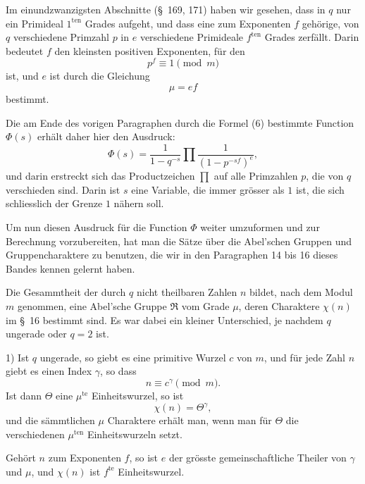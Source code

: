 \documentclass[11pt]{article}
\begin{document}
Im einundzwanzigsten Abschnitte (\S~169, 171) haben wir gesehen, dass in $q$ nur ein Primideal $1^{\mathrm{ten}}$ Grades aufgeht, und dass eine zum Exponenten $f$ gehörige, von $q$ verschiedene Primzahl $p$ in $e$ verschiedene Primideale $f^{\mathrm{ten}}$ Grades zerfällt. Darin bedeutet $f$ den kleinsten positiven Exponenten, für den
\begin{equation}
p^f\equiv1\pmod m
\tag{2}
\end{equation}
ist, und $e$ ist durch die Gleichung
\begin{equation}
\mu=ef
\tag{3}
\end{equation}
bestimmt.

Die am Ende des vorigen Paragraphen durch die Formel (6) bestimmte Function $\Phi(s)$ erhält daher hier den Ausdruck:
\begin{equation}
\Phi(s)=\frac1{1-q^{-s}}\prod\frac1{(1-p^{-sf})^e},
\tag{4}
\end{equation}
und darin erstreckt sich das Productzeichen $\prod$ auf alle Primzahlen $p$, die von $q$ verschieden sind. Darin ist $s$ eine Variable, die immer grösser als $1$ ist, die sich schliesslich der Grenze $1$ nähern soll.

Um nun diesen Ausdruck für die Function $\Phi$ weiter umzuformen und zur Berechnung vorzubereiten, hat man die Sätze über die Abel'schen Gruppen und Gruppencharaktere zu benutzen, die wir in den Paragraphen 14 bis 16 dieses Bandes kennen gelernt haben.

Die Gesammtheit der durch $q$ nicht theilbaren Zahlen $n$ bildet, nach dem Modul $m$ genommen, eine Abel'sche Gruppe $\mathfrak R$ vom Grade $\mu$, deren Charaktere $\chi(n)$ im \S~16 bestimmt sind. Es war dabei ein kleiner Unterschied, je nachdem $q$ ungerade oder $q=2$ ist.

1) Ist $q$ ungerade, so giebt es eine primitive Wurzel $c$ von $m$, und für jede Zahl $n$ giebt es einen Index $\gamma$, so dass
\begin{equation}
n\equiv c^\gamma\pmod m.
\tag{5}
\end{equation}
Ist dann $\Theta$ eine $\mu^{\mathrm{te}}$ Einheitswurzel, so ist
\begin{equation}
\chi(n)=\Theta^\gamma,
\tag{6}
\end{equation}
und die sämmtlichen $\mu$ Charaktere erhält man, wenn man für $\Theta$ die verschiedenen $\mu^{\mathrm{ten}}$ Einheitswurzeln setzt.

Gehört $n$ zum Exponenten $f$, so ist $e$ der grösste gemeinschaftliche Theiler von $\gamma$ und $\mu$, und $\chi(n)$ ist $f^{\mathrm{te}}$ Einheitswurzel.
\end{document}
